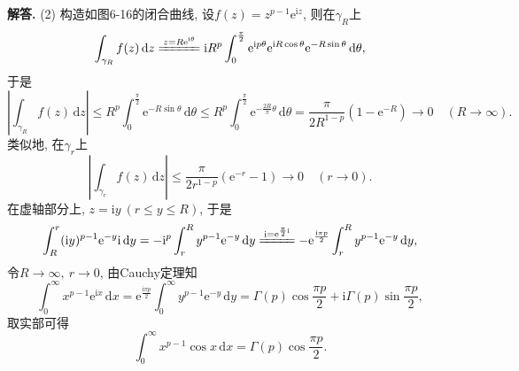 \documentclass[12pt, a4paper, oneside]{ctexart}
\newenvironment{solution}{\par\noindent\textbf{解答. }}{\bigskip\par}
\let\leq=\leqslant %
\def\d{\mathrm{d}}      %
\def\e{\mathrm{e}}      %
\def\i{\mathrm{i}}      %
\def\del{\vspace{-3.5ex}}  %
\begin{document}
\begin{solution}
    (2) 构造如图6-16的闭合曲线, 设$f(z) = z^{p-1}\e^{\i z}$, 则在$\gamma_R$上
    \begin{equation*}
        \int_{\gamma_{R}}f(z)\,\d z \xlongequal{z = R\e^{\i \theta}} \i R^{p}\int_{0}^{\frac{\pi}{2}}\e^{\i p\theta}\e^{\i R\cos\theta}\e^{-R\sin\theta}\,\d \theta,
    \end{equation*}
    于是
    \begin{equation*}
        \left|\int_{\gamma_R}f(z)\,\d z\right| \leq R^p\int_0^{\frac{\pi}{2}}\e^{-R\sin\theta}\,\d \theta\leq  R^{p}\int_0^{\frac{\pi}{2}}\e^{-\frac{2R}{\pi}\theta}\,\d\theta = \frac{\pi}{2R^{1-p}}\left(1-\e^{-R}\right)\to 0\quad(R\to\infty).
    \end{equation*}
    类似地, 在$\gamma_r$上
    \begin{equation*}
        \left|\int_{\gamma_r}f(z)\,\d z\right| \leq \frac{\pi}{2r^{1-p}}\left(\e^{-r}-1\right)\to 0\quad(r\to 0).
    \end{equation*}
    在虚轴部分上, $z = \i y\ (r\leq y\leq R)$, 于是
    \begin{equation*}
        \int_R^r(\i y)^{p-1}\e^{-y}\i\,\d y =-\i^p\int_r^Ry^{p-1}\e^{-y}\,\d y\xlongequal{\i = \e^{\frac{\pi}{2}\i}} -\e^{\frac{\i \pi p}{2}}\int_r^Ry^{p-1}\e^{-y}\,\d y,
    \end{equation*}
    令$R\to\infty,\ r\to 0$, 由Cauchy定理知
    \begin{equation*}
        \int_0^{\infty}x^{p-1}\e^{\i x}\,\d x = \e^{\frac{\i\pi p}{2}}\int_0^{\infty}y^{p-1}\e^{-y}\,\d y = \Gamma(p)\cos \frac{\pi p}{2}+\i\Gamma(p)\sin \frac{\pi p}{2},
    \end{equation*}
    取实部可得
    \begin{equation*}
        \int_0^{\infty}x^{p-1}\cos x\,\d x = \Gamma(p)\cos\frac{\pi p}{2}.
    \end{equation*}
\end{solution}\del
\end{document}
